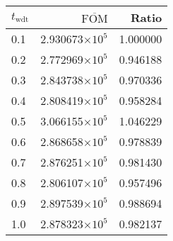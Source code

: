 \begin{tabular}{lrr}
\toprule
$t_{\mathrm{wdt}}$ & $\overline{\mathrm{FOM}}$ &    Ratio \\
\midrule
               0.1 &   2.930673$\times 10^{5}$ & 1.000000 \\
               0.2 &   2.772969$\times 10^{5}$ & 0.946188 \\
               0.3 &   2.843738$\times 10^{5}$ & 0.970336 \\
               0.4 &   2.808419$\times 10^{5}$ & 0.958284 \\
               0.5 &   3.066155$\times 10^{5}$ & 1.046229 \\
               0.6 &   2.868658$\times 10^{5}$ & 0.978839 \\
               0.7 &   2.876251$\times 10^{5}$ & 0.981430 \\
               0.8 &   2.806107$\times 10^{5}$ & 0.957496 \\
               0.9 &   2.897539$\times 10^{5}$ & 0.988694 \\
               1.0 &   2.878323$\times 10^{5}$ & 0.982137 \\
\bottomrule
\end{tabular}

